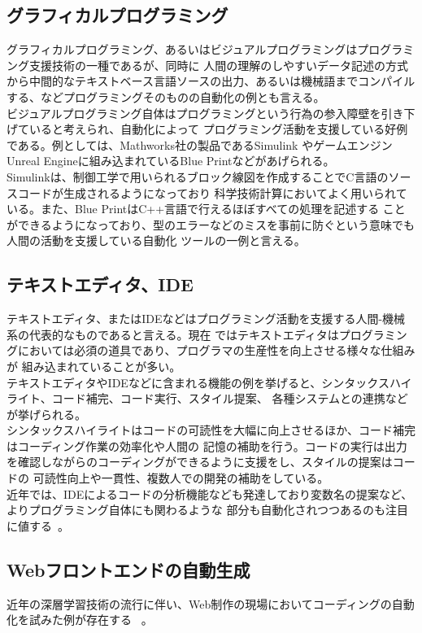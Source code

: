 \documentclass[10pt,a4paper]{ltjsarticle}       %
\begin{document}
\subsection{グラフィカルプログラミング}
グラフィカルプログラミング、あるいはビジュアルプログラミングはプログラミング支援技術の一種であるが、同時に
人間の理解のしやすいデータ記述の方式から中間的なテキストベース言語ソースの出力、あるいは機械語までコンパイル
する、などプログラミングそのものの自動化の例とも言える。\\

ビジュアルプログラミング自体はプログラミングという行為の参入障壁を引き下げていると考えられ、自動化によって
プログラミング活動を支援している好例である。例としては、Mathworks社の製品であるSimulink\cite{simulink}
やゲームエンジンUnreal Engineに組み込まれているBlue Print\cite{blueprint}などがあげられる。\\
Simulinkは、制御工学で用いられるブロック線図を作成することでC言語のソースコードが生成されるようになっており
科学技術計算においてよく用いられている。また、Blue PrintはC++言語で行えるほぼすべての処理を記述する
ことができるようになっており、型のエラーなどのミスを事前に防ぐという意味でも人間の活動を支援している自動化
ツールの一例と言える。
\subsection{テキストエディタ、IDE}
テキストエディタ、またはIDEなどはプログラミング活動を支援する人間-機械系の代表的なものであると言える。現在
ではテキストエディタはプログラミングにおいては必須の道具であり、プログラマの生産性を向上させる様々な仕組みが
組み込まれていることが多い。\\

テキストエディタやIDEなどに含まれる機能の例を挙げると、シンタックスハイライト、コード補完、コード実行、スタイル提案、
各種システムとの連携などが挙げられる。\\
シンタックスハイライトはコードの可読性を大幅に向上させるほか、コード補完はコーディング作業の効率化や人間の
記憶の補助を行う。コードの実行は出力を確認しながらのコーディングができるように支援をし、スタイルの提案はコードの
可読性向上や一貫性、複数人での開発の補助をしている。\\

近年では、IDEによるコードの分析機能なども発達しており変数名の提案など、よりプログラミング自体にも関わるような
部分も自動化されつつあるのも注目に値する~\cite{codeanalysis}。
\subsection{Webフロントエンドの自動生成}
近年の深層学習技術の流行に伴い、Web制作の現場においてコーディングの自動化を試みた例が存在する~
\cite{autowebprogramming}。


\end{document}

